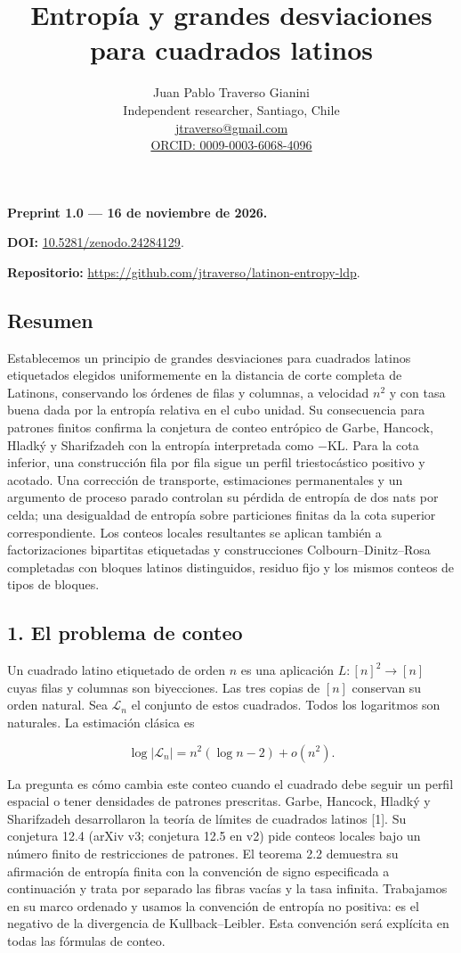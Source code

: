 \documentclass[spanish,11pt,a4paper]{article}
\title{Entropía y grandes desviaciones para cuadrados latinos}
\author{Juan Pablo Traverso Gianini\\\small Independent researcher, Santiago, Chile\\\small \href{mailto:jtraverso@gmail.com}{jtraverso@gmail.com}\\\small \href{https://orcid.org/0009-0003-6068-4096}{ORCID: 0009-0003-6068-4096}}
\date{}
\begin{document}
\raggedbottom\maketitle
\textbf{Preprint 1.0 --- 16 de noviembre de 2026.}

\textbf{DOI:} \href{https://doi.org/10.5281/zenodo.24284129}{10.5281/zenodo.24284129}.

\textbf{Repositorio:} \url{https://github.com/jtraverso/latinon-entropy-ldp}.

\subsection{Resumen}\label{resumen}

Establecemos un principio de grandes desviaciones para cuadrados latinos etiquetados elegidos uniformemente en la distancia de corte completa de Latinons, conservando los órdenes de filas y columnas, a velocidad \(n^2\) y con tasa buena dada por la entropía relativa en el cubo unidad. Su consecuencia para patrones finitos confirma la conjetura de conteo entrópico de Garbe, Hancock, Hladký y Sharifzadeh con la entropía interpretada como \(-\mathrm{KL}\). Para la cota inferior, una construcción fila por fila sigue un perfil triestocástico positivo y acotado. Una corrección de transporte, estimaciones permanentales y un argumento de proceso parado controlan su pérdida de entropía de dos nats por celda; una desigualdad de entropía sobre particiones finitas da la cota superior correspondiente. Los conteos locales resultantes se aplican también a factorizaciones bipartitas etiquetadas y construcciones Colbourn--Dinitz--Rosa completadas con bloques latinos distinguidos, residuo fijo y los mismos conteos de tipos de bloques.

\subsection{1. El problema de conteo}\label{el-problema-de-conteo}

Un cuadrado latino etiquetado de orden \(n\) es una aplicación \(L:[n]^2\to[n]\) cuyas filas y columnas son biyecciones. Las tres copias de \([n]\) conservan su orden natural. Sea \(\mathcal L_n\) el conjunto de estos cuadrados. Todos los logaritmos son naturales. La estimación clásica es

\nopagebreak[4]
\[\log|\mathcal L_n|=n^2(\log n-2)+o(n^2).\tag{1.1}\]

La pregunta es cómo cambia este conteo cuando el cuadrado debe seguir un perfil espacial o tener densidades de patrones prescritas. Garbe, Hancock, Hladký y Sharifzadeh desarrollaron la teoría de límites de cuadrados latinos {[}1{]}. Su conjetura 12.4 (arXiv v3; conjetura 12.5 en v2) pide conteos locales bajo un número finito de restricciones de patrones. El teorema 2.2 demuestra su afirmación de entropía finita con la convención de signo especificada a continuación y trata por separado las fibras vacías y la tasa infinita. Trabajamos en su marco ordenado y usamos la convención de entropía no positiva: es el negativo de la divergencia de Kullback--Leibler. Esta convención será explícita en todas las fórmulas de conteo.
\end{document}
